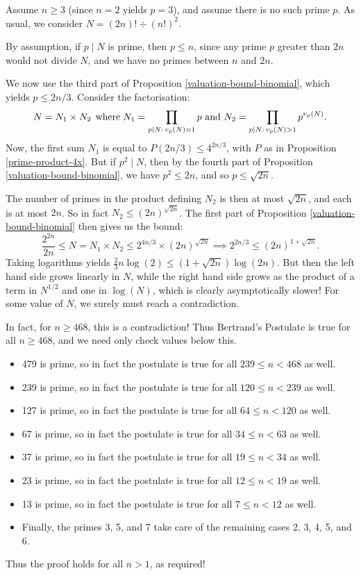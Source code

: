 \documentclass{article}
\begin{document}
\begin{prf}
    Assume $n \geq 3$ (since $n = 2$ yields $p = 3$), and assume there is no such prime $p$. As usual, we consider $N = (2n)! \div (n!)^2$.
    
    By assumption, if $p \mid N$ is prime, then $p \leq n$, since any prime $p$ greater than $2n$ would not divide $N$, and we have no primes between $n$ and $2n$.
    
    We now use the third part of Proposition \ref{valuation-bound-binomial}, which yields $p \leq 2n/3$. Consider the factorisation:
    \[
	N = N_1 \times N_2 \mathrel{\, \text{where}}
	N_1 = \prod_{p \mid N : \, v_p(N) = 1} p
	\text{ and }
	N_2 = \prod_{p \mid N : \, v_p(N) > 1} p^{v_p(N)}.
	\]
	Now, the first sum $N_1$ is equal to $P(2n/3) \leq 4^{2n/3}$, with $P$ as in Proposition \ref{prime-product-4x}. But if $p^2 \mid N$, then by the fourth part of Proposition \ref{valuation-bound-binomial}, we have $p^2 \leq 2n$, and so $p \leq \sqrt{2n}$.
	
	The number of primes in the product defining $N_2$ is then at most $\sqrt{2n}$, and each is at most $2n$. So in fact $N_2 \leq (2n)^{\sqrt{2n}}$. The first part of Proposition \ref{valuation-bound-binomial} then gives us the bound:
	\[
	\frac{2^{2n}}{2n} \leq N = N_1 \times N_2 \leq 2^{4n/3} \times (2n)^{\sqrt{2n}} \implies 2^{2n/3} \leq (2n)^{1 + \sqrt{2n}}.
	\]
	Taking logarithms yields $\frac{2}{3}n \log(2) \leq (1 + \sqrt{2n}) \log(2n)$. But then the left hand side grows linearly in $N$, while the right hand side grows as the product of a term in $N^{1/2}$ and one in $\log(N)$, which is clearly asymptotically slower! For some value of $N$, we surely must reach a contradiction.
	
	In fact, for $n \geq 468$, this is a contradiction! Thus Bertrand's Postulate is true for all $n \geq 468$, and we need only check values below this.
	\begin{itemize}
		\item 479 is prime, so in fact the postulate is true for all $239 \leq n < 468$ as well.
		\item 239 is prime, so in fact the postulate is true for all $120 \leq n < 239$ as well.
		\item 127 is prime, so in fact the postulate is true for all $64 \leq n < 120$ as well.
		\item 67 is prime, so in fact the postulate is true for all $34 \leq n < 63$ as well.
		\item 37 is prime, so in fact the postulate is true for all $19 \leq n < 34$ as well.
		\item 23 is prime, so in fact the postulate is true for all $12 \leq n < 19$ as well.
		\item 13 is prime, so in fact the postulate is true for all $7 \leq n < 12$ as well.
		\item Finally, the primes 3, 5, and 7 take care of the remaining cases 2, 3, 4, 5, and 6.
	\end{itemize}
	Thus the proof holds for all $n > 1$, as required!
\end{prf}
\end{document}
